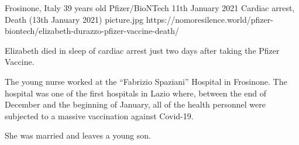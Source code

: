 {Frosinone, Italy}
{39 years old}
{Pfizer/BioNTech}
{11th January 2021}
{Cardiac arrest, Death (13th January 2021)}
{picture.jpg}
{https://nomoresilence.world/pfizer-biontech/elizabeth-durazzo-pfizer-vaccine-death/}
{

Elizabeth died in sleep of cardiac arrest just two days after taking the Pfizer
Vaccine.

The young nurse worked at the “Fabrizio Spaziani” Hospital in Frosinone. The
hospital was one of the first hospitals in Lazio where, between the end of
December and the beginning of January, all of the health personnel were
subjected to a massive vaccination against Covid-19.

She was married and leaves a young son.

}
